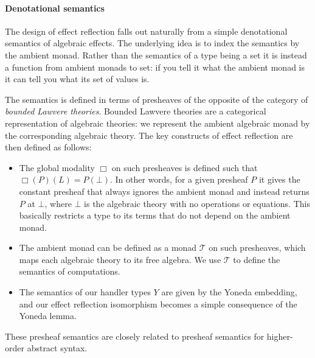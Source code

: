\documentclass[acmsmall, screen, nonacm]{acmart}
\newcommand{\glob}{\mathop{\Box}}
\newcommand{\initial}{\bot}
\newcommand{\mon}{\mathcal{T}}
\begin{document}
\paragraph{Denotational semantics} The design of effect reflection falls
out naturally from a simple denotational semantics of algebraic
effects. The underlying idea is to index the semantics by the ambient
monad. Rather than the semantics of a type being a set it is instead a
function from ambient monads to set: if you tell it what the ambient
monad is it can tell you what its set of values is.

The semantics is defined in terms of presheaves of the opposite of the
category of \emph{bounded Lawvere theories}. Bounded Lawvere theories
are a categorical representation of algebraic theories: we represent the
ambient algebraic monad by the corresponding algebraic theory. The key
constructs of effect reflection are then defined as follows:

\begin{itemize}
\item The global modality $\glob$ on such presheaves is defined such
  that $\glob(P)(L) = P(\initial)$. In other words, for a given presheaf
  $P$ it gives the constant presheaf that always ignores the ambient
  monad and instead returns $P$ at $\initial$, where $\initial$ is the
  algebraic theory with no operations or equations. This basically
  restricts a type to its terms that do not depend on the ambient monad.

\item The ambient monad can be defined as a monad $\mon$ on such
  presheaves, which maps each algebraic theory to its free algebra. We use
  $\mon$ to define the semantics of computations.

\item The semantics of our handler types $Y$ are given by the Yoneda
  embedding, and our effect reflection isomorphism becomes a simple
  consequence of the Yoneda lemma.
\end{itemize}

These presheaf semantics are closely related to presheaf semantics for
higher-order abstract syntax\cite{??}.
\end{document}
